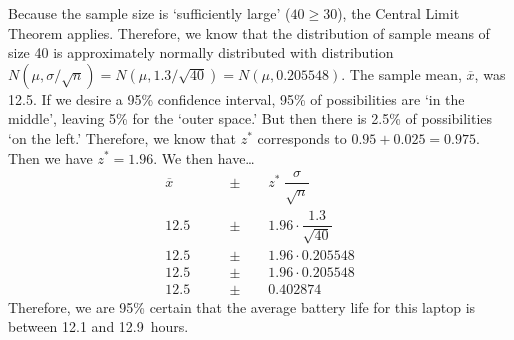 \documentclass[11pt,letterpaper]{article}
\begin{document}
\sol Because the sample size is `sufficiently large' ($40 \geq 30$), the Central Limit Theorem applies. Therefore, we know that the distribution of sample means of size 40 is approximately normally distributed with distribution $N(\mu, \sigma/\sqrt{n})= N(\mu, 1.3/\sqrt{40})= N(\mu, 0.205548)$. The sample mean, $\overline{x}$, was 12.5. If we desire a 95\% confidence interval, 95\% of possibilities are `in the middle', leaving 5\% for the `outer space.' But then there is 2.5\% of possibilities `on the left.' Therefore, we know that $z^*$ corresponds to $0.95 + 0.025= 0.975$. Then we have $z^*= 1.96$. We then have\dots
	\[
	\begin{aligned}
	\overline{x} \qquad &\pm \qquad z^* \; \dfrac{\sigma}{\sqrt{n}} \\
	12.5 \qquad &\pm \qquad 1.96 \cdot \dfrac{1.3}{\sqrt{40}} \\
	12.5 \qquad &\pm \qquad 1.96 \cdot 0.205548 \\
	12.5 \qquad &\pm \qquad 1.96 \cdot 0.205548 \\
	12.5 \qquad &\pm \qquad 0.402874
	\end{aligned}
	\] \pspace
Therefore, we are 95\% certain that the average battery life for this laptop is between 12.1 and 12.9~hours. 
\end{document}
